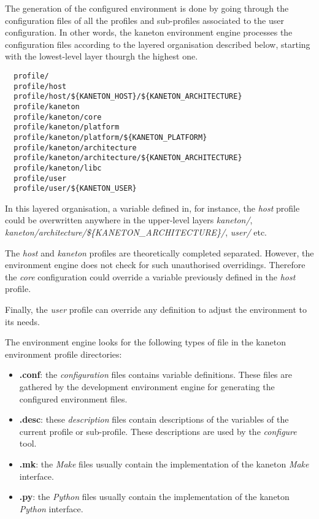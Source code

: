 The generation of the configured environment is done by going through
the configuration files of all the profiles and sub-profiles associated
to the user configuration. In other words, the kaneton environment engine
processes the configuration files according to the layered organisation
described below, starting with the lowest-level layer thourgh the highest one.

\begin{verbatim}
  profile/
  profile/host
  profile/host/${KANETON_HOST}/${KANETON_ARCHITECTURE}
  profile/kaneton
  profile/kaneton/core
  profile/kaneton/platform
  profile/kaneton/platform/${KANETON_PLATFORM}
  profile/kaneton/architecture
  profile/kaneton/architecture/${KANETON_ARCHITECTURE}
  profile/kaneton/libc
  profile/user
  profile/user/${KANETON_USER}         
\end{verbatim}

In this layered organisation, a variable defined in, for instance, the
\textit{host} profile could be overwritten anywhere in the upper-level layers
\textit{kaneton/}, \textit{kaneton/architecture/\$\{KANETON\_ARCHITECTURE\}/},
\textit{user/} etc.

The \textit{host} and \textit{kaneton} profiles are theoretically completed
separated. However, the environment engine does not check for such
unauthorised overridings. Therefore the \textit{core} configuration could
override a variable previously defined in the \textit{host} profile.

Finally, the \textit{user} profile can override any definition to adjust the
environment to its needs.

The environment engine looks for the following types of file in the
kaneton environment profile directories:

\begin{itemize}
  \item
    \textbf{.conf}: the \textit{configuration} files contains variable
    definitions. These files are gathered by the development environment
    engine for generating the configured environment files.
  \item
    \textbf{.desc}: these \textit{description} files contain descriptions of
    the variables of the current profile or sub-profile. These descriptions
    are used by the \textit{configure} tool.
  \item
    \textbf{.mk}: the \textit{Make} files usually contain the implementation
    of the kaneton \textit{Make} interface.
  \item
    \textbf{.py}: the \textit{Python} files usually contain the
    implementation of the kaneton \textit{Python} interface.
\end{itemize}

